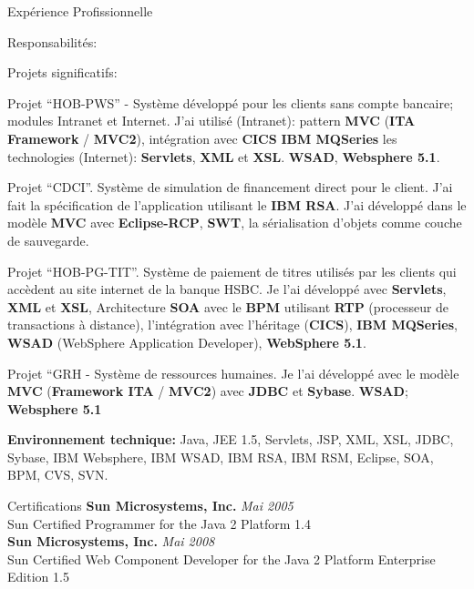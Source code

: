 \documentclass{resume}
\begin{document}
\begin{rSection}{Expérience Profissionnelle}
\begin{rSubsection}{Responsabilités:}{}{}{}
    \end{rSubsection}
    \begin{rSubsection}{Projets significatifs:}{}{}{}
    \item Projet “HOB-PWS” - Système développé pour les clients sans compte bancaire; modules Intranet et Internet. J’ai utilisé (Intranet): pattern \textbf{MVC} (\textbf{ITA Framework} / \textbf{MVC2}), intégration avec \textbf{CICS} \textbf{IBM MQSeries} les technologies (Internet): \textbf{Servlets}, \textbf{XML} et \textbf{XSL}. \textbf{WSAD}, \textbf{Websphere 5.1}.\\
    \item Projet “CDCI”. Système de simulation de financement direct pour le client. J’ai fait la spécification de l’application utilisant le \textbf{IBM RSA}. J’ai développé dans le modèle \textbf{MVC} avec \textbf{Eclipse-RCP}, \textbf{SWT}, la sérialisation d'objets comme couche de sauvegarde.\\
    \item Projet “HOB-PG-TIT”. Système de paiement de titres utilisés par les clients qui accèdent au site internet de la banque HSBC. Je l’ai développé avec \textbf{Servlets}, \textbf{XML} et \textbf{XSL}, Architecture \textbf{SOA} avec le \textbf{BPM} utilisant \textbf{RTP} (processeur de transactions à distance), l'intégration avec l'héritage (\textbf{CICS}), \textbf{IBM MQSeries}, \textbf{WSAD} (WebSphere Application Developer), \textbf{WebSphere 5.1}.\\
    \item Projet “GRH - Système de ressources humaines. Je l’ai développé avec le modèle \textbf{MVC} (\textbf{Framework ITA} / \textbf{MVC2}) avec \textbf{JDBC} et \textbf{Sybase}. \textbf{WSAD}; \textbf{Websphere 5.1}
    \end{rSubsection}

    {\fontsize{8}{9}\selectfont \textbf{Environnement technique:} Java, JEE 1.5, Servlets, JSP, XML, XSL, JDBC, Sybase, IBM Websphere, IBM WSAD, IBM RSA, IBM RSM, Eclipse, SOA, BPM, CVS, SVN.}
  \end{rSection}

  \begin{rSection}{Certifications}
    {\bf Sun Microsystems, Inc.} \hfill {\em Mai 2005} \\ 
    {Sun Certified Programmer for the Java 2 Platform 1.4} \\

    {\bf Sun Microsystems, Inc.} \hfill {\em Mai 2008} \\ 
    {Sun Certified Web Component Developer for the Java 2 Platform Enterprise Edition 1.5} \\
  \end{rSection}
  
\end{document}

